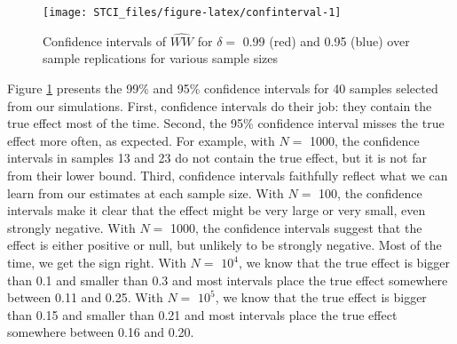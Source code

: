 \documentclass[]{book}
\newenvironment{Shaded}{\begin{snugshade}}{\end{snugshade}}
\newcommand{\CommentTok}[1]{\textcolor[rgb]{0.56,0.35,0.01}{\textit{#1}}}
\newcommand{\DataTypeTok}[1]{\textcolor[rgb]{0.13,0.29,0.53}{#1}}
\newcommand{\DecValTok}[1]{\textcolor[rgb]{0.00,0.00,0.81}{#1}}
\newcommand{\KeywordTok}[1]{\textcolor[rgb]{0.13,0.29,0.53}{\textbf{#1}}}
\newcommand{\NormalTok}[1]{#1}
\newcommand{\OperatorTok}[1]{\textcolor[rgb]{0.81,0.36,0.00}{\textbf{#1}}}
\newcommand{\StringTok}[1]{\textcolor[rgb]{0.31,0.60,0.02}{#1}}
\theoremstyle{definition}
\theoremstyle{definition}
\theoremstyle{definition}
\theoremstyle{remark}
\begin{document}
\begin{Shaded}
\end{Shaded}

\begin{figure}[htbp]

{\centering \texttt{[image: STCI\_files/figure-latex/confinterval-1]} 

}

\caption{Confidence intervals of $\hat{WW}$ for $\delta=$ 0.99 (red) and 0.95 (blue) over sample replications for various sample sizes}\label{fig:confinterval}
\end{figure}

Figure \ref{fig:confinterval} presents the 99\% and 95\% confidence intervals for 40 samples selected from our simulations.
First, confidence intervals do their job: they contain the true effect most of the time.
Second, the 95\% confidence interval misses the true effect more often, as expected.
For example, with \(N=\) 1000, the confidence intervals in samples 13 and 23 do not contain the true effect, but it is not far from their lower bound.
Third, confidence intervals faithfully reflect what we can learn from our estimates at each sample size.
With \(N=\) 100, the confidence intervals make it clear that the effect might be very large or very small, even strongly negative.
With \(N=\) 1000, the confidence intervals suggest that the effect is either positive or null, but unlikely to be strongly negative.
Most of the time, we get the sign right.
With \(N=\) \ensuremath{10^{4}}, we know that the true effect is bigger than 0.1 and smaller than 0.3 and most intervals place the true effect somewhere between 0.11 and 0.25.
With \(N=\) \ensuremath{10^{5}}, we know that the true effect is bigger than 0.15 and smaller than 0.21 and most intervals place the true effect somewhere between 0.16 and 0.20.
\end{document}
